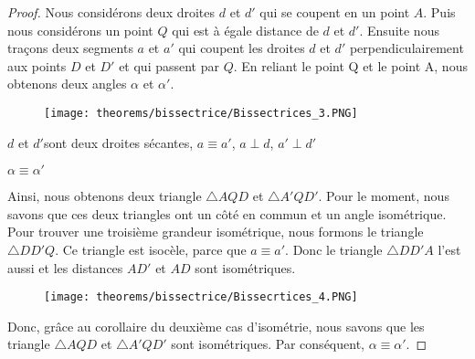 \documentclass[a4paper,12pt]{article}
\begin{document}
\begin{proof}
Nous considérons deux droites $d$ et $d'$ qui se coupent en un point $A$. Puis nous considérons un point $Q$ qui est à égale distance de $d$ et $d'$. Ensuite nous traçons deux segments $a$ et $a'$ qui coupent les droites $d$ et $d'$ perpendiculairement aux points $D$ et $D'$ et qui passent par $Q$. En reliant le point Q et le point A, nous obtenons deux angles $\alpha$ et $\alpha'$.

 \begin{figure}[H]
    \centering
    \texttt{[image: theorems/bissectrice/Bissectrices\_3.PNG]}
\end{figure}


\begin{hyp}
$d$ et $d'$sont deux droites sécantes, $a\equiv a'$, $a\perp d$, $a' \perp d'$
\end{hyp}
\begin{concl}
$\alpha \equiv \alpha'$
\end{concl}
Ainsi, nous obtenons deux triangle $\triangle AQD$ et $\triangle A'QD'$. Pour le moment, nous savons que ces deux triangles ont un côté en commun et un angle isométrique. Pour trouver une troisième grandeur isométrique, nous formons le triangle $\triangle DD'Q$. Ce triangle est isocèle, parce que $a\equiv a'$. Donc le triangle $\triangle DD'A$ l'est aussi et les distances $AD'$ et $AD$ sont isométriques. 

 \begin{figure}[H]
    \centering
    \texttt{[image: theorems/bissectrice/Bissecrtices\_4.PNG]}
\end{figure}


Donc, grâce au corollaire du deuxième cas d'isométrie, nous savons que les triangle $\triangle AQD$ et $\triangle A'QD'$ sont isométriques. Par conséquent, $\alpha \equiv \alpha'$.
\end{proof}
\end{document}
